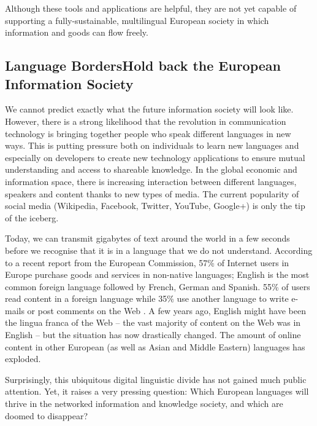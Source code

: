 \documentclass[]{../../metanetpaper}
\begin{document}
\begin{multicols}{2}
Although these tools and applications are helpful, they are not yet capable of supporting a fully-sustainable, multilingual European society in which information and goods can flow freely.

\subsection[Language Borders Hold back the European Information Society]{Language Borders\newline Hold back the European Information Society}

We cannot predict exactly what the future information society will look like. However, there is a strong likelihood that the revolution in communication technology is bringing together people who speak different languages in new ways. This is putting pressure both on individuals to learn new languages and especially on developers to create new technology applications to ensure mutual understanding and access to shareable knowledge. In the global economic and information space, there is increasing interaction between different languages, speakers and content thanks to new types of media. The current popularity of social media (Wikipedia, Facebook, Twitter, YouTube, Google+) is only the tip of the iceberg.


Today, we can transmit gigabytes of text around the world in a few seconds before we recognise that it is in a language that we do not understand. According to a recent report from the European Commission, 57\% of Internet users in Europe purchase goods and services in non-native languages; English is the most common foreign language followed by French, German and Spanish. 55\% of users read content in a foreign language while 35\% use another language to write e-mails or post comments on the Web \cite{EC1}. A few years ago, English might have been the lingua franca of the Web -- the vast majority of content on the Web was in English -- but the situation has now drastically changed. The amount of online content in other European (as well as Asian and Middle Eastern) languages has exploded.

Surprisingly, this ubiquitous digital linguistic divide has not gained much public attention. Yet, it raises a very pressing question: Which European languages will thrive in the networked information and knowledge society, and which are doomed to disappear?


\end{multicols}
\end{document}
